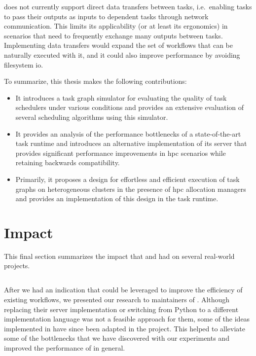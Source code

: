 \begin{description}[wide=0pt]
		\hyperqueue{} does not currently support direct data transfers
		between tasks, i.e.\ enabling tasks to pass their outputs as inputs to dependent tasks through
		network communication. This limits its applicability (or at least its ergonomics) in scenarios that
		need to frequently exchange many outputs between tasks. Implementing data transfers would expand
		the set of workflows that can be naturally executed with it, and it could also improve performance
		by avoiding filesystem \gls{io}.
\end{description}

To summarize, this thesis makes the following contributions:
\begin{itemize}
	\item It introduces a task graph simulator for evaluating the quality of task schedulers under various
	      conditions and provides an extensive evaluation of several scheduling algorithms using this
	      simulator.
	\item It provides an analysis of the performance bottlenecks of a state-of-the-art task runtime
	      \dask{} and introduces an alternative implementation of its server that provides
	      significant performance improvements in \gls{hpc} scenarios while retaining
	      backwards compatibility.
	\item Primarily, it proposes a design for effortless and efficient execution of task graphs on
	      heterogeneous clusters in the presence of \gls{hpc} allocation managers and
	      provides an implementation of this design in the \hyperqueue{} task runtime.
\end{itemize}

\section{Impact}
This final section summarizes the impact that \rsds{} and
\hyperqueue{} had on several real-world projects.

\vspace{-2mm}\subsection*{\rsds{}}
After we had an indication that \rsds{} could be leveraged to improve the
efficiency of existing \dask{} workflows, we presented our \rdsd{} research to maintainers of \dask{}. Although replacing their server implementation or switching from Python
to a different implementation language was not a feasible approach for them, some of the ideas
implemented in \rsds{} have since been adapted in the \dask{}
project. This helped to alleviate some of the bottlenecks that we have discovered with our
experiments and improved the performance of \dask{} in
general.

